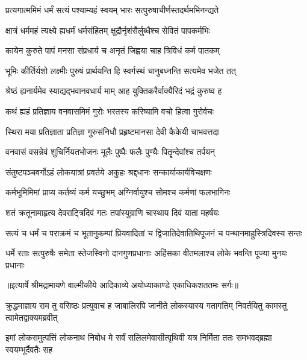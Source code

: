\twolineshloka
{प्रत्यगात्ममिमं धर्मं सत्यं पश्याम्यहं स्वयम्}
{भारः सत्पुरुषाचीर्णस्तदर्थमभिनन्द्यते} %

\twolineshloka
{क्षात्रं धर्ममहं त्यक्ष्ये ह्यधर्मं धर्मसंहितम्}
{क्षुद्रौर्नृशंसैर्लुब्धैश्च सेवितं पापकर्मभिः} %

\twolineshloka
{कायेन कुरुते पापं मनसा संप्रधार्य च}
{अनृतं जिह्वया चाह त्रिविधं कर्म पातकम्} %

\twolineshloka
{भूमिः कीर्तिर्यशो लक्ष्मीः पुरुषं प्रार्थयन्ति हि}
{स्वर्गस्थं चानुबध्नन्ति सत्यमेव भजेत तत्} %

\twolineshloka
{श्रेष्ठं ह्यनार्यमेव स्याद्यद्भवानवधार्य माम्}
{आह युक्तिकरैर्वाक्यैरिदं भद्रं कुरुष्व ह} %

\twolineshloka
{कथं ह्यहं प्रतिज्ञाय वनवासमिमं गुरोः}
{भरतस्य करिष्यामि वचो हित्वा गुरोर्वचः} %

\twolineshloka
{स्थिरा मया प्रतिज्ञाता प्रतिज्ञा गुरुसंनिधौ}
{प्रहृष्टमानसा देवी कैकेयी चाभवत्तदा} %

\twolineshloka
{वनवासं वसन्नेवं शुचिर्नियतभोजनः}
{मूलैः पुष्पैः फलैः पुण्यैः पितॄन्देवांश्च तर्पयन्} %

\twolineshloka
{संतुष्टपञ्चवर्गोऽहं लोकयात्रां प्रवर्तये}
{अकुहः श्रद्दधानः सन्कार्याकार्यविचक्षणः} %

\twolineshloka
{कर्मभूमिमिमां प्राप्य कर्तव्यं कर्म यच्छुभम्}
{अग्निर्वायुश्च सोमश्च कर्मणां फलभागिनः} %

\twolineshloka
{शतं क्रतूनामाहृत्य देवराट्त्रिदिवं गतः}
{तपांस्युग्राणि चास्थाय दिवं याता महर्षयः} %

\fourlineindentedshloka
{सत्यं च धर्मं च पराक्रमं च}
{ भूतानुकम्पां प्रियवादितां च}
{द्विजातिदेवातिथिपूजनं च}
{ पन्थानमाहुस्त्रिदिवस्य सन्तः} %

\fourlineindentedshloka
{धर्मे रताः सत्पुरुषैः समेता}
{स्तेजस्विनो दानगुणप्रधानाः}
{अहिंसका वीतमलाश्च लोके}
{ भवन्ति पूज्या मुनयः प्रधानाः} %


{॥इत्यार्षे श्रीमद्रामायणे वाल्मीकीये आदिकाव्ये अयोध्याकाण्डे एकाधिकशततमः सर्गः॥}


\threelineshloka
{क्रुद्धमाज्ञाय राम तु वसिष्ठः प्रत्युवाच ह}
{जाबालिरपि जानीते लोकस्यास्य गतागतिम्}
{निवर्तयितु कामस्तु त्वामेतद्वाक्यमब्रवीत्} %

\threelineshloka
{इमां लोकसमुत्पत्तिं लोकनाथ निबोध मे}
{सर्वं सलिलमेवासीत्पृथिवी यत्र निर्मिता}
{ततः समभवद्ब्रह्मा स्वयम्भूर्दैवतैः सह} %

